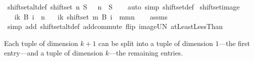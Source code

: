 \begin{isabellebody}
%
\endisadelimproof
\isanewline
\isanewline
\isanewline
{}\isamarkupfalse%
\ shiftset{\isacharunderscore}{\kern0pt}altdef{\isacharcolon}{\kern0pt}\ {\isachardoublequoteopen}shiftset\ n\ S\ {\isacharequal}{\kern0pt}\ {\isacharparenleft}{\kern0pt}{\isacharplus}{\kern0pt}{\isacharparenright}{\kern0pt}\ n\ {\isacharbackquote}{\kern0pt}\ S{\isachardoublequoteclose}\isanewline
%
\isadelimproof
\ \ %
\endisadelimproof
%
\isatagproof
{}\isamarkupfalse%
\ {\isacharparenleft}{\kern0pt}auto\ simp{\isacharcolon}{\kern0pt}\ shiftset{\isacharunderscore}{\kern0pt}def{\isacharparenright}{\kern0pt}%
\endisatagproof
{\isafoldproof}%
%
\isadelimproof
\isanewline
%
\endisadelimproof
{}\isamarkupfalse%
\ shiftset{\isacharunderscore}{\kern0pt}image{\isacharcolon}{\kern0pt}\isanewline
\ \ \ {\isachardoublequoteopen}{\isacharparenleft}{\kern0pt}{\isasymUnion}i{\isasymin}{\isacharbraceleft}{\kern0pt}{\isachardot}{\kern0pt}{\isachardot}{\kern0pt}k{\isacharbraceright}{\kern0pt}{\isachardot}{\kern0pt}\ B\ i{\isacharparenright}{\kern0pt}\ {\isacharequal}{\kern0pt}\ {\isacharbraceleft}{\kern0pt}{\isachardot}{\kern0pt}{\isachardot}{\kern0pt}{\isacharless}{\kern0pt}n{\isacharbraceright}{\kern0pt}{\isachardoublequoteclose}\isanewline
\ \ \ {\isachardoublequoteopen}{\isacharparenleft}{\kern0pt}{\isasymUnion}i{\isasymin}{\isacharbraceleft}{\kern0pt}{\isachardot}{\kern0pt}{\isachardot}{\kern0pt}k{\isacharbraceright}{\kern0pt}{\isachardot}{\kern0pt}\ shiftset\ m\ {\isacharparenleft}{\kern0pt}B\ i{\isacharparenright}{\kern0pt}{\isacharparenright}{\kern0pt}\ {\isacharequal}{\kern0pt}\ {\isacharbraceleft}{\kern0pt}m{\isachardot}{\kern0pt}{\isachardot}{\kern0pt}{\isacharless}{\kern0pt}m{\isacharplus}{\kern0pt}n{\isacharbraceright}{\kern0pt}{\isachardoublequoteclose}\isanewline
%
\isadelimproof
\ \ %
\endisadelimproof
%
\isatagproof
{}\isamarkupfalse%
\ assms\ \isamarkupfalse%
\ {\isacharparenleft}{\kern0pt}simp\ add{\isacharcolon}{\kern0pt}\ shiftset{\isacharunderscore}{\kern0pt}altdef\ add{\isachardot}{\kern0pt}commute\ flip{\isacharcolon}{\kern0pt}\ image{\isacharunderscore}{\kern0pt}UN\ atLeast{}LessThan{\isacharparenright}{\kern0pt}%
\endisatagproof
{\isafoldproof}%
%
\isadelimproof
%
\endisadelimproof
%
\begin{isamarkuptext}%
Each tuple of dimension $k+1$ can be split into a tuple of dimension $1$---the first entry---and a tuple of dimension $k$---the remaining entries.%
\end{isamarkuptext}\isamarkuptrue%

\end{isabellebody}
